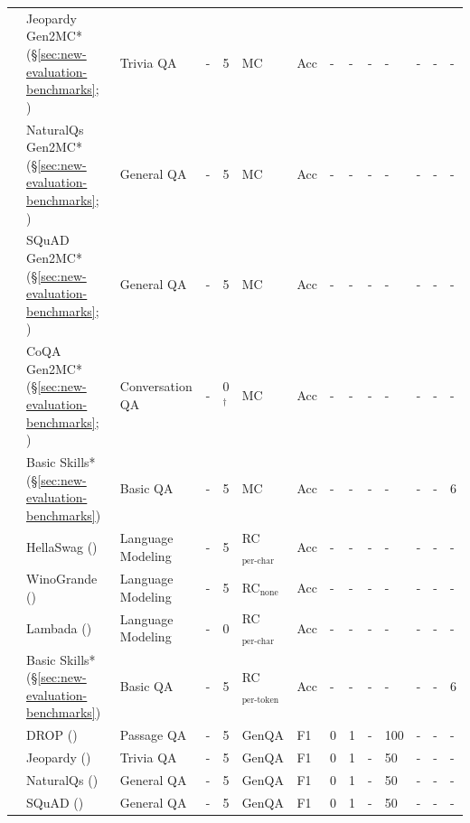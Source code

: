 \documentclass[table]{ai2style/ai2}
\begin{document}
{{\begin{table}[t]
\begin{scriptsize}
{\begin{tabular}{llHHlllllHllHl}
 & Jeopardy Gen2MC* (\S\ref{sec:new-evaluation-benchmarks}; \citeyear{mosaic-jeopardy}) & Trivia QA & - & 5 & MC & Acc & - & - & - & - & - & - & - \\
 & NaturalQs Gen2MC* (\S\ref{sec:new-evaluation-benchmarks}; \citeyear{kwiatkowski-etal-2019-natural}) & General QA & - & 5 & MC & Acc & - & - & - & - & - & - & - \\
 & SQuAD Gen2MC* (\S\ref{sec:new-evaluation-benchmarks}; \citeyear{rajpurkar-etal-2016-squad}) & General QA & - & 5 & MC & Acc & - & - & - & - & - & - & - \\
 & CoQA Gen2MC* (\S\ref{sec:new-evaluation-benchmarks}; \citeyear{reddy-etal-2019-coqa}) & Conversation QA & - & 0$^\dagger$ & MC & Acc & - & - & - & - & - & - & - \\
  & Basic Skills* (\S\ref{sec:new-evaluation-benchmarks}) & Basic QA & - & 5 & MC & Acc & - & - & - & - & - & - & 6 \\
 & HellaSwag (\citeyear{zellers-etal-2019-hellaswag}) & Language Modeling & - & 5 & RC$_\text{per-char}$ & Acc & - & - & - & - & - & - & - \\
 & WinoGrande (\citeyear{Sakaguchi_Le_Bras_Bhagavatula_Choi_2020}) & Language Modeling & - & 5 & RC$_\text{none}$ & Acc & - & - & - & - & - & - & - \\
 & Lambada (\citeyear{paperno2016lambada}) & Language Modeling & - & 0 & RC$_\text{per-char}$ & Acc & - & - & - & - & - & - & - \\
 & Basic Skills* (\S\ref{sec:new-evaluation-benchmarks}) & Basic QA & - & 5 & RC$_\text{per-token}$ & Acc & - & - & - & - & - & - & 6 \\
 & DROP (\citeyear{dua-etal-2019-drop}) & Passage QA & - & 5 & GenQA & F1 & 0 & 1 & - & 100 & - & - & - \\
 & Jeopardy (\citeyear{mosaic-jeopardy}) & Trivia QA & - & 5 & GenQA & F1 & 0 & 1 & - & 50 & - & - & - \\
 & NaturalQs (\citeyear{kwiatkowski-etal-2019-natural}) & General QA & - & 5 & GenQA & F1 & 0 & 1 & - & 50 & - & - & - \\
 & SQuAD (\citeyear{rajpurkar-etal-2016-squad}) & General QA & - & 5 & GenQA & F1 & 0 & 1 & - & 50 & - & - & - \\

\end{tabular}}
\end{scriptsize}
\end{table}}}
\end{document}
